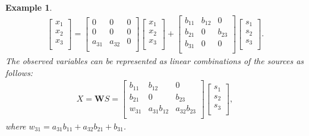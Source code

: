 \documentclass[12pt]{article}
\newtheorem{example}{Example}
\newcommand{\bW}{\mathbf{W}}
\begin{document}
\begin{example}
\begin{align} \label{eq:example1_1}
\begin{bmatrix}
x_1 \\
x_2 \\
x_3 \\
\end{bmatrix}
 = 
\begin{bmatrix}
0 & 0 & 0 \\
0 & 0 & 0 \\
a_{31} & a_{32} & 0 \\
\end{bmatrix}
\begin{bmatrix}
x_1 \\
x_2 \\
x_3 \\
\end{bmatrix}
+
\begin{bmatrix}
b_{11} & b_{12} & 0 \\
b_{21} & 0 & b_{23} \\
b_{31} & 0 & 0 \\
\end{bmatrix}
\begin{bmatrix}
s_1 \\
s_2 \\
s_3 \\
\end{bmatrix}
.
\end{align}
The observed variables can be represented as linear combinations of the sources as follows: 
\begin{align} \nonumber
X = \bW S
=
\begin{bmatrix}
b_{11} & b_{12} & 0 \\
b_{21} & 0 & b_{23} \\
w_{31} & a_{31}b_{12} & a_{32}b_{23} \\
\end{bmatrix}
\begin{bmatrix}
s_1 \\
s_2 \\
s_3 \\
\end{bmatrix},
\end{align}
where $w_{31}=a_{31}b_{11}+ a_{32}b_{21} + b_{31}$.


\end{example}
\end{document}
